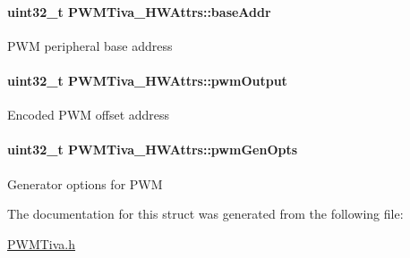 \paragraph[{base\-Addr}]{\setlength{\rightskip}{0pt plus 5cm}uint32\-\_\-t P\-W\-M\-Tiva\-\_\-\-H\-W\-Attrs\-::base\-Addr}\label{struct_p_w_m_tiva___h_w_attrs_a12270fd5eca318763aab674472954692}
P\-W\-M peripheral base address 
\paragraph[{pwm\-Output}]{\setlength{\rightskip}{0pt plus 5cm}uint32\-\_\-t P\-W\-M\-Tiva\-\_\-\-H\-W\-Attrs\-::pwm\-Output}\label{struct_p_w_m_tiva___h_w_attrs_a125b0d4868fff9b2e30624fbbdc67df9}
Encoded P\-W\-M offset address 
\paragraph[{pwm\-Gen\-Opts}]{\setlength{\rightskip}{0pt plus 5cm}uint32\-\_\-t P\-W\-M\-Tiva\-\_\-\-H\-W\-Attrs\-::pwm\-Gen\-Opts}\label{struct_p_w_m_tiva___h_w_attrs_a000c25643c0e7aff1422a6a7b812193f}
Generator options for P\-W\-M 

The documentation for this struct was generated from the following file\-:\begin{DoxyCompactItemize}
\item 
\hyperlink{_p_w_m_tiva_8h}{P\-W\-M\-Tiva.\-h}\end{DoxyCompactItemize}
